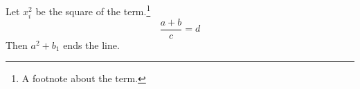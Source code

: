 \documentclass{article}
\begin{document}
Let $x_{i}^{2}$ be the square of the term.\footnote{A footnote about the term.}
\[ \frac{a+b}{c} = d \]
Then $a^2+b_1$ ends the line.
\end{document}

